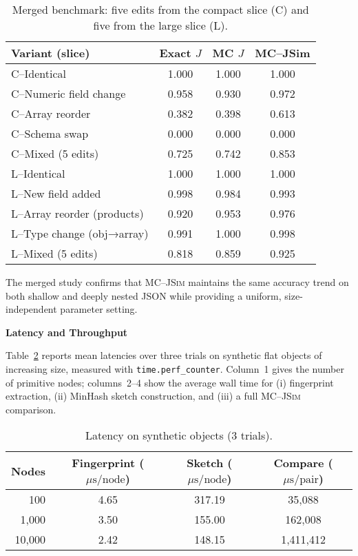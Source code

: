\documentclass[sigconf]{acmart}
\begin{document}
\begin{table}[t]
\centering
\caption{Merged benchmark: five edits from the compact slice (C) and five from
         the large slice (L).}
\label{tab:merged}
\begin{tabular}{@{}lccc@{}}
\toprule
Variant (slice)                & Exact $J$ & MC $J$ & MC--JSim \\ \midrule
C–Identical                    & 1.000 & 1.000 & 1.000 \\
C–Numeric field change         & 0.958 & 0.930 & 0.972 \\
C–Array reorder                & 0.382 & 0.398 & 0.613 \\
C–Schema swap                  & 0.000 & 0.000 & 0.000 \\
C–Mixed (5 edits)              & 0.725 & 0.742 & 0.853 \\
\midrule
L–Identical                    & 1.000 & 1.000 & 1.000 \\
L–New field added              & 0.998 & 0.984 & 0.993 \\
L–Array reorder (products)     & 0.920 & 0.953 & 0.976 \\
L–Type change (obj→array)      & 0.991 & 1.000 & 0.998 \\
L–Mixed (5 edits)              & 0.818 & 0.859 & 0.925 \\
\bottomrule
\end{tabular}
\end{table}

The merged study confirms that \textsc{MC--JSim} maintains the same
accuracy trend on both shallow and deeply nested JSON while providing a
uniform, size-independent parameter setting.

\bigskip
\noindent\textbf{Latency and Throughput}

Table~\ref{tab:latency} reports mean latencies over three trials on
synthetic flat objects of increasing size, measured with
\texttt{time.perf\_counter}.  Column~1 gives the number of primitive
nodes; columns~2–4 show the average wall time for (i) fingerprint extraction,  
(ii) MinHash sketch construction, and  
(iii) a full \textsc{MC--JSim} comparison.  

\begin{table}[t]
\centering
\caption{Latency on synthetic objects (3 trials).}
\label{tab:latency}
\begin{tabular}{@{}rccc@{}}
\toprule
Nodes &
Fingerprint (\(\mu\text{s}/\text{node}\)) &
Sketch (\(\mu\text{s}/\text{node}\)) &
Compare (\(\mu\text{s}/\text{pair}\)) \\
\midrule
  100   & 4.65 & 317.19 & 35,088 \\
1,000  & 3.50 & 155.00 & 162,008 \\
10,000 & 2.42 & 148.15 & 1,411,412 \\
\bottomrule
\end{tabular}
\end{table}
\end{document}
